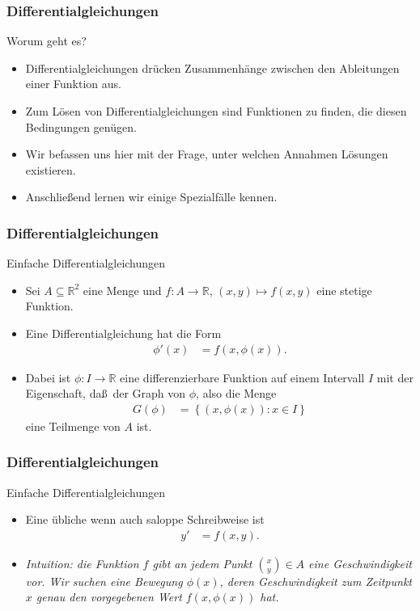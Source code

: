 \documentclass{beamer}
\title[Annuma]{\mytitle}
\author[Amin Coja-Oghlan]{Amin Coja-Oghlan}
\institute[Frankfurt]{JWGUFFM}
\date{}
\newcommand\RR{\mathbb R}
\newcommand\cbc[1]{\left\{{#1}\right\}}
\renewcommand{\ae}{\"a}
\renewcommand{\oe}{\"o}
\newcommand{\ue}{\"u}
\newcommand{\mytitle}{Differentialgleichungen}
\begin{document}
\frame[plain]{\titlepage}

\begin{frame}\frametitle{\mytitle}
	\begin{block}{Worum geht es?}
		\begin{itemize}
			\item Differentialgleichungen dr\ue cken Zusammenh\ae nge zwischen den Ableitungen einer Funktion aus.
			\item Zum L\oe sen von Differentialgleichungen sind Funktionen zu finden, die diesen Bedingungen gen\ue gen.
			\item Wir befassen uns hier mit der Frage, unter welchen Annahmen L\oe sungen existieren.
			\item Anschlie\ss end lernen wir einige Spezialf\ae lle kennen.
		\end{itemize}
	\end{block}
\end{frame}

\begin{frame}\frametitle{\mytitle}
	\begin{block}{Einfache Differentialgleichungen}
		\begin{itemize}
			\item Sei $A\subseteq\RR^2$ eine Menge und $f:A\to\RR$, $(x,y)\mapsto f(x,y)$ eine stetige Funktion.
			\item Eine \alert{Differentialgleichung} hat die Form
				\begin{align*}
					\phi'(x)&=f(x,\phi(x)).
				\end{align*}
			\item Dabei ist $\phi:I\to\RR$ eine differenzierbare Funktion auf einem Intervall $I$ mit der Eigenschaft, da\ss\ der Graph von $\phi$, also die Menge
				\begin{align*}
					G(\phi)&=\cbc{(x,\phi(x)):x\in I}
				\end{align*}
				eine Teilmenge von $A$ ist.
		\end{itemize}
	\end{block}
\end{frame}

\begin{frame}\frametitle{\mytitle}
	\begin{block}{Einfache Differentialgleichungen}
		\begin{itemize}
			\item Eine \ue bliche wenn auch saloppe Schreibweise ist
				\begin{align*}
					y'&=f(x,y).
				\end{align*}
			\item {\itshape Intuition: die Funktion $f$ gibt an jedem Punkt $\binom xy\in A$ eine Geschwindigkeit vor. Wir suchen eine Bewegung $\phi(x)$, deren Geschwindigkeit zum Zeitpunkt $x$ genau den vorgegebenen Wert $f(x,\phi(x))$ hat.}
		\end{itemize}
	\end{block}
\end{frame}
\end{document}
